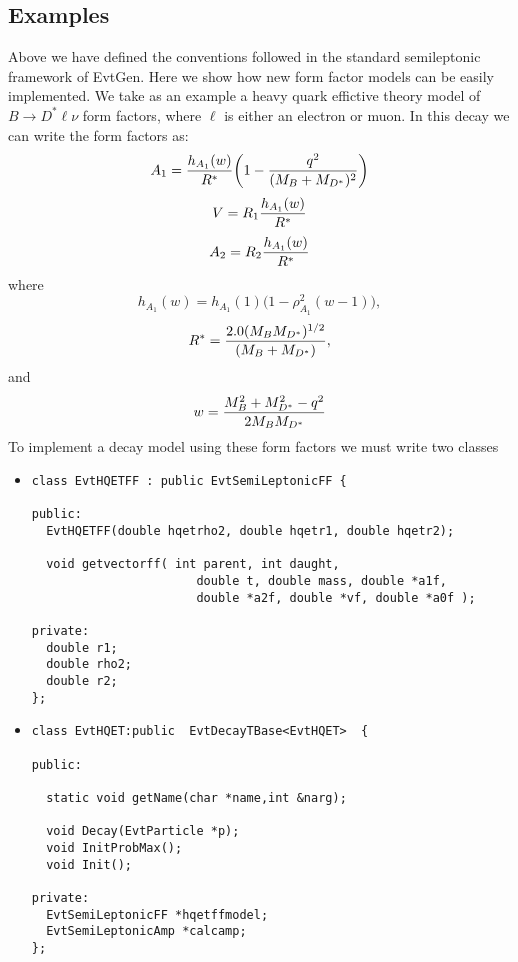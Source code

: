 \documentclass[6pt]{article}
\begin{document}
\subsection{Examples}
\label{sec:examples}
Above we have defined the conventions followed in the standard
semileptonic framework of EvtGen.  Here we show how new
form factor models can be easily implemented.  We take as an
example a heavy quark effictive theory model of 
$B \rightarrow D^* \ell \nu$ form factors, where $\ell$ is
either an electron or muon.  In this decay we can write the
form factors as:
\begin{equation}
A_1 = {{h_{A_1}(w)} \over {R^*}} \biggl ( 1 - { {q^2} \over {(M_B + M_{D^*})^2}}
\biggr )
\end{equation}
\begin{equation}
V = R_1 {{h_{A_1}(w)} \over {R^*}}
\end{equation}
\begin{equation}
A_2 = R_2 {{h_{A_1}(w)} \over {R^*}}
\end{equation}
\noindent where
\begin{equation}
h_{A_1}(w) = h_{A_1}(1) \biggl (1 - \rho_{A_1}^2(w-1) \biggr ),
\end{equation}
\begin{equation}
R^* = { {2.0 (M_B M_{D^*})^{1/2}} \over {(M_B+M_{D^*})}},
\end{equation} 
\noindent and
\begin{equation}
w = { {M_B^2 + M_{D^*}^2 -q^2} \over { 2 M_B M_{D^*}} }
\end{equation}
\noindent To implement a decay model using these form factors
we must write two classes
\begin{itemize} 
\item
\begin{verbatim}
class EvtHQETFF : public EvtSemiLeptonicFF {

public:
  EvtHQETFF(double hqetrho2, double hqetr1, double hqetr2);

  void getvectorff( int parent, int daught,
                       double t, double mass, double *a1f,
                       double *a2f, double *vf, double *a0f );

private:
  double r1;
  double rho2;
  double r2;
};
\end{verbatim}
\item
\begin{verbatim}
class EvtHQET:public  EvtDecayTBase<EvtHQET>  {

public:

  static void getName(char *name,int &narg);

  void Decay(EvtParticle *p);
  void InitProbMax();
  void Init();

private:
  EvtSemiLeptonicFF *hqetffmodel;
  EvtSemiLeptonicAmp *calcamp;
};
\end{verbatim}
\end{itemize}
\end{document}
